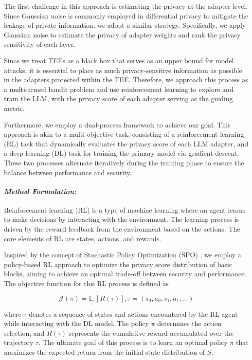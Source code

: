 \documentclass{article}
\begin{document}
The first challenge in this approach is estimating the privacy at the adapter level. Since Gaussian noise is commonly employed in differential privacy to mitigate the leakage of private information, we adopt a similar strategy. Specifically, we apply Gaussian noise to estimate the privacy of adapter weights and rank the privacy sensitivity of each layer.

Since we treat TEEs as a black box that serves as an upper bound for model attacks, it is essential to place as much privacy-sensitive information as possible in the adapters protected within the TEE. Therefore, we approach this process as a multi-armed bandit problem and use reinforcement learning to explore and train the LLM, with the privacy score of each adapter serving as the guiding metric.

Furthermore, we employ a dual-process framework to achieve our goal. This approach is akin to a multi-objective task, consisting of a reinforcement learning (RL) task that dynamically evaluates the privacy score of each LLM adapter, and a deep learning (DL) task for training the primary model via gradient descent. These two processes alternate iteratively during the training phase to ensure the balance between performance and security.

\paragraph{\textit{Method Formulation:}}
Reinforcement learning (RL) is a type of machine learning where an agent learns to make decisions by interacting with the environment. The learning process is driven by the reward feedback from the environment based on the actions. The core elements of RL are states, actions, and rewards. 

Inspired by the concept of Stochastic Policy Optimization (SPO) \cite{schulman2017proximal}, we employ a policy-based RL approach to optimize the privacy score distribution of basic blocks, aiming to achieve an optimal trade-off between security and performance. The objective function for this RL process is defined as

\begin{equation}
\mathcal{J}(\pi) = \mathbb{E}_{\tau}[R(\tau)], \tau = (s_0,a_0,s_1,a_1,...)
\end{equation}

where $\tau$ denotes a sequence of states and actions encountered by the RL agent while interacting with the DL model. The policy $\pi$ determines the action selection, and $R(\tau)$ represents the cumulative reward accumulated over the trajectory $\tau$. The ultimate goal of this process is to learn an optimal policy $\pi$ that maximizes the expected return from the initial state distribution of $S$.
\end{document}
